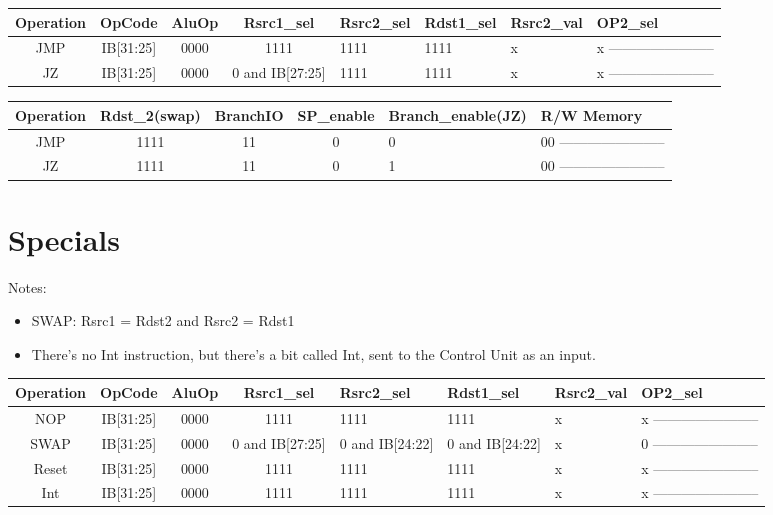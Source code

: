\documentclass[12pt]{report}
\begin{document}
    \begin{center}
    \begin{tabular}{||c| c| c| c| p{40mm}||} 
    \hline
    Operation & OpCode & AluOp & Rsrc1_sel & Rsrc2_sel & Rdst1_sel & Rsrc2_val & OP2_sel  \\ [0.5ex] 
    \hline\hline
    JMP & IB[31:25] & 0000 & 1111 & 1111 & 1111 & x & x ----------------------- \\
    \hline
    JZ & IB[31:25] & 0000 & 0 and IB[27:25] & 1111 & 1111 & x & x ----------------------- \\
    \hline
    \end{tabular}
    \end{center}

    \begin{center}
    \begin{tabular}{||c| c| c| c| p{40mm}||} 
    \hline
    Operation & Rdst_2(swap) & BranchIO & SP_enable & Branch_enable(JZ) & R/W Memory  \\ [0.5ex] 
    \hline\hline
    JMP & 1111 & 11 & 0 & 0 & 00 ----------------------- \\
    \hline
    JZ & 1111 & 11 & 0 & 1 & 00 ----------------------- \\
    \hline
    \end{tabular}
    \end{center}


    \section{Specials}
    \item Notes:
    \begin{itemize}
        \item SWAP: Rsrc1 = Rdst2 and Rsrc2 = Rdst1
        \item There's no Int instruction, but there's a bit called Int, sent to the Control Unit as an input.
    \end{itemize}

    \begin{center}
    \begin{tabular}{||c| c| c| c| p{40mm}||} 
    \hline
    Operation & OpCode & AluOp & Rsrc1_sel & Rsrc2_sel & Rdst1_sel & Rsrc2_val & OP2_sel  \\ [0.5ex] 
    \hline\hline
    NOP & IB[31:25] & 0000 & 1111 & 1111 & 1111 & x & x ----------------------- \\
    \hline
    SWAP & IB[31:25] & 0000 & 0 and IB[27:25] & 0 and IB[24:22] & 0 and IB[24:22] & x & 0 ----------------------- \\
    \hline
    Reset & IB[31:25] & 0000 & 1111 & 1111 & 1111 & x & x ----------------------- \\
    \hline
    Int & IB[31:25] & 0000 & 1111 & 1111 & 1111 & x & x ----------------------- \\
    \hline
    \end{tabular}
    \end{center}
\end{document}
